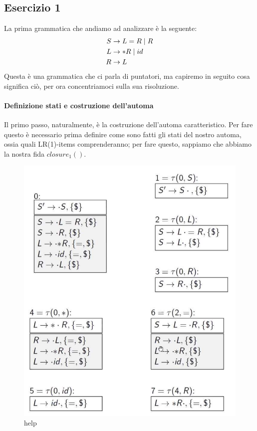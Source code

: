 \documentclass[class=book, crop=false, oneside, 12pt]{standalone}
\begin{document}
\subsection*{Esercizio 1}
La prima grammatica che andiamo ad analizzare è la seguente:
\begin{align}
    \label{gr:pointers-grammar}
    S &\to L = R \mid R \\
    L &\to *R \mid id \nonumber \\ \notag
    R &\to L \notag
\end{align}
Questa è una grammatica che ci parla di puntatori, ma capiremo in seguito cosa significa ciò, per ora concentriamoci sulla sua risoluzione. 

\paragraph{Definizione stati e costruzione dell'automa}
Il primo passo, naturalmente, è la costruzione dell'automa caratteristico. Per fare questo è necessario prima definire come sono fatti gli stati del nostro automa, ossia quali LR(1)-items comprenderanno; per fare questo, sappiamo che abbiamo la nostra fida \(closure_1()\).
\begin{figure}[H]
    \centering
    \includegraphics[width=.8\textwidth]{send_help_1.png}
    \caption{help}
\end{figure}
\end{document}
